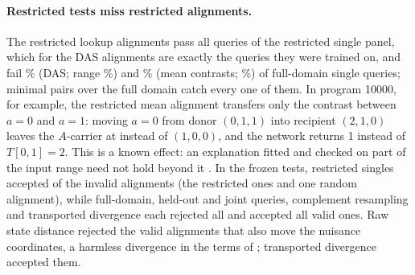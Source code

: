 \paragraph{Restricted tests miss restricted alignments.}
The \CmpRestrictedAlignments{} restricted lookup alignments pass all \CmpRestrictedQueries{} queries of the
restricted single panel, which for the DAS alignments are exactly the queries they were trained on, and fail
\CmpRateDasSingle\% (DAS; range \CmpRateDasSingleRange\%) and \CmpRateMeanSingle\% (mean contrasts;
\CmpRateMeanSingleRange\%) of full-domain single queries; minimal pairs over the full domain catch every one of them.
In program 10000, for example, the restricted mean alignment transfers only the contrast between $a=0$ and $a=1$:
moving $a=0$ from donor $(0,1,1)$ into recipient $(2,1,0)$ leaves the $A$-carrier at \ExCarrierAfter{} instead of
$(1,0,0)$, and the network returns 1 instead of $T[0,1]=2$. This is a known effect: an explanation fitted and checked
on part of the input range need not hold beyond it \citep{friedman2024illusions,rai2026datadriven}.
In the frozen tests, restricted singles accepted \CmpRestrictedAccepted{} of the \CmpInvalid{} invalid alignments (the
\CmpRestrictedAlignments{} restricted ones and one random alignment), while full-domain, held-out and joint queries,
complement resampling and transported divergence each rejected all \CmpInvalid{} and accepted all \CmpValid{} valid
ones. Raw state distance rejected the \CmpRawFalseRejected{} valid alignments that also move the nuisance
coordinates, a harmless divergence in the terms of \citet{grant2026divergent}; transported divergence accepted them.
